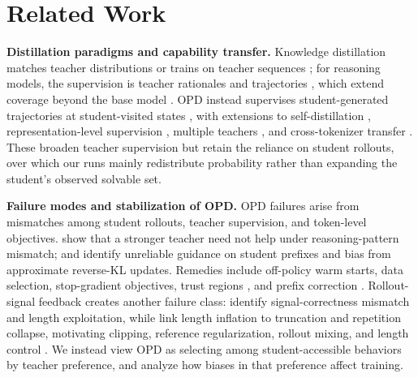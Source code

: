 \section{Related Work}
\label{sec:related_work}

\textbf{Distillation paradigms and capability transfer.}
Knowledge distillation matches teacher distributions \citep{hinton2015distilling} or trains on teacher sequences \citep{kim2016sequence}; for reasoning models, the supervision is teacher rationales and trajectories \citep{ho2023large, hsieh2023distilling, mukherjee2023orcaprogressivelearningcomplex, mitra2023orca2teachingsmall, guo2025deepseek}, which extend coverage beyond the base model \citep{yue2025does}.
OPD instead supervises student-generated trajectories at student-visited states \citep{gu2024minillm, agarwal2023gkd}, with extensions to
self-distillation \citep{zhao2026selfdistilledreasoneronpolicyselfdistillation, ye2026onpolicycontextdistillationlanguage, he2026selfdistillationzeroselfrevisionturns},
representation-level supervision \citep{yang2026oprdonpolicyrepresentationdistillation},
multiple teachers \citep{ma2026mopdmultiteacheronpolicydistillation, yang2026learningteachergeneralizedonpolicy, team2026kimi},
and cross-tokenizer transfer \citep{he2026simpleopdsimpletokenizeragnosticonpolicy, wang2026crosstokenizeronpolicydistillationbyteprefix}.
These broaden teacher supervision but retain the reliance on student rollouts, over which our runs mainly redistribute probability rather than expanding the student's observed solvable set.

\textbf{Failure modes and stabilization of OPD.}
OPD failures arise from mismatches among student rollouts, teacher supervision, and token-level objectives.
\citet{li2026rethinkingopd} show that a stronger teacher need not help under reasoning-pattern mismatch; \citet{fu2026revisiting} and \citet{zhu2026facesonpolicydistillationpitfalls} identify unreliable guidance on student prefixes and bias from approximate reverse-KL updates.
Remedies include off-policy warm starts, data selection, stop-gradient objectives, trust regions \citep{xing2026trustregiononpolicydistillation}, and prefix correction \citep{jiang2026trajectoryrefineddistillation}.
Rollout-signal feedback creates another failure class: \citet{wang2026demystifyingonpolicydistillationroles} identify signal-correctness mismatch and length exploitation, while \citet{luo2026demystifyingopdlengthinflation} link length inflation to truncation and repetition collapse, motivating clipping, reference regularization, rollout mixing, and length control \citep{he2026simpleopdsimpletokenizeragnosticonpolicy, heo2026onpolicydeltadistillation}.
We instead view OPD as selecting among student-accessible behaviors by teacher preference, and analyze how biases in that preference affect training.

